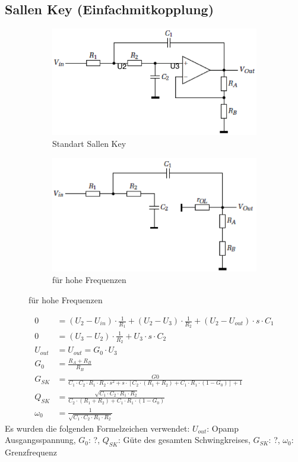 \subsection{Sallen Key (Einfachmitkopplung)}
\begin{figure}[ht]
	\centering
	\begin{subfigure}[b]{0.4\textwidth}
		\centering
		\includegraphics[scale=0.4]{./pictures/sallenkey.png}
		\caption{Standart Sallen Key}
	\end{subfigure}
	\qquad\qquad
	\begin{subfigure}[b]{0.4\textwidth}
		\centering
		\includegraphics[scale=0.4]{./pictures/sallenkey2.png}
		\caption{für hohe Frequenzen}
	\end{subfigure}
\end{figure}
\begin{align*}
	0		&= (U_2-U_{in})\cdot \frac{1}{R_1}+(U_2-U_3)\cdot \frac{1}{R_2}+(U_2-U_{out})\cdot s\cdot C_1 \\
	0		&= (U_3-U_2)\cdot \frac{1}{R_2}+U_3\cdot s\cdot C_2\\
	U_{out}	&= U_{out}=G_0\cdot U_3 \\
	G_0		&= \frac{R_{A}+R_{B}}{R_{B}}\\
	G_{SK}	&= \frac{G0}{C_1\cdot C_2\cdot R_1\cdot R_2\cdot s^2+s\cdot [C_2\cdot (R_1+R_2)+C_1\cdot R_1\cdot (1-G_0)]+1}\\
	Q_{SK}	&= \frac{\sqrt{C_1\cdot C_2\cdot R_1\cdot R_2}}{C_2\cdot (R_1+R_2)+C_1\cdot R_1\cdot (1-G_0)}\\
	\omega_0 &= \frac{1}{\sqrt{C_1\cdot C_2\cdot R_1\cdot R_2}}
\end{align*}
Es wurden die folgenden Formelzeichen verwendet: $U_{out}$: Opamp Ausgangsspannung, $G_0$: ?, $Q_{SK}$: Güte des gesamten Schwingkreises, $G_{SK}$: ?,
$\omega_0$: Grenzfrequenz

